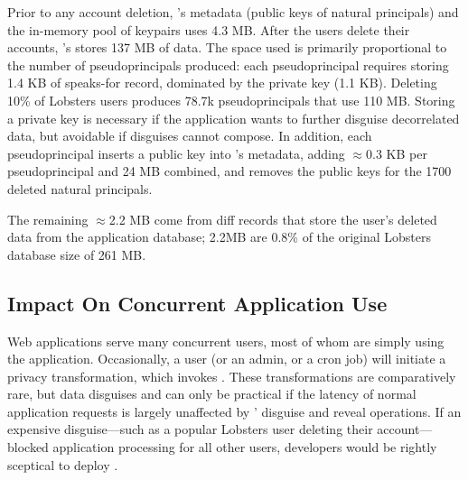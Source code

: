 %
Prior to any account deletion, \sys's metadata (public keys of natural
principals) and the in-memory pool of keypairs uses 4.3 MB.
%
After the users delete their accounts, \sys's stores 137 MB of data.
%
The space used is primarily proportional to the number of pseudoprincipals
produced: each pseudoprincipal requires storing 1.4 KB of speaks-for
record, dominated by the private key (1.1 KB).
%
Deleting 10\% of Lobsters users produces 78.7k pseudoprincipals that use
110 MB.
%
Storing a private key is necessary if the application wants to further
disguise decorrelated data, but avoidable if disguises cannot compose.
%
In addition, each pseudoprincipal inserts a public key into \sys's
metadata, adding $\approx$0.3 KB per pseudoprincipal and 24 MB combined,
and \sys removes the public keys for the 1700 deleted natural principals.
%

%
The remaining $\approx$2.2 MB come from diff records that store the
user's deleted data from the application database; 2.2MB are 0.8\% of the
original Lobsters database size of 261 MB.

\subsection{Impact On Concurrent Application Use}
\label{s:eval-conc}

%
Web applications serve many concurrent users, most of whom are simply using the
application.
%
Occasionally, a user (or an admin, or a cron job) will initiate a privacy
transformation, which invokes \sys.
%
These transformations are comparatively rare, but data disguises and \sys can
only be practical if the latency of normal application requests is largely
unaffected by \sys' disguise and reveal operations.
%
If an expensive disguise---such as a popular Lobsters user deleting their
account---blocked application processing for all other users, developers would
be rightly sceptical to deploy \sys.
%

